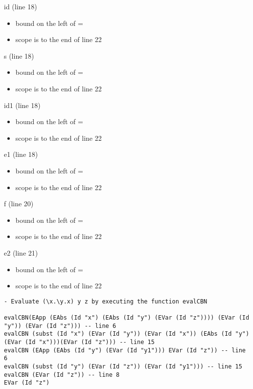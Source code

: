 \documentclass{article}
\theoremstyle{theorem}
\theoremstyle{definition}
\theoremstyle{remark}
\begin{document}
\indent
id (line 18)
\begin{itemize}
  \item bound on the left of =
  \item scope is to the end of line 22
\end{itemize}

\indent
s (line 18)
\begin{itemize}
  \item bound on the left of =
  \item scope is to the end of line 22
\end{itemize}

\indent
id1 (line 18)
\begin{itemize}
  \item bound on the left of =
  \item scope is to the end of line 22
\end{itemize}

\indent
e1 (line 18)
\begin{itemize}
  \item bound on the left of =
  \item scope is to the end of line 22
\end{itemize}

\indent
f (line 20)
\begin{itemize}
  \item bound on the left of =
  \item scope is to the end of line 22
\end{itemize}

\indent
e2 (line 21)
\begin{itemize}
  \item bound on the left of =
  \item scope is to the end of line 22
\end{itemize}

\begin{lstlisting}
- Evaluate (\x.\y.x) y z by executing the function evalCBN

evalCBN(EApp (EAbs (Id "x") (EAbs (Id "y") (EVar (Id "z")))) (EVar (Id "y")) (EVar (Id "z"))) -- line 6
evalCBN (subst (Id "x") (EVar (Id "y")) (EVar (Id "x")) (EAbs (Id "y") (EVar (Id "x")))(EVar (Id "z"))) -- line 15
evalCBN (EApp (EAbs (Id "y") (EVar (Id "y1"))) EVar (Id "z")) -- line 6
evalCBN (subst (Id "y") (EVar (Id "z")) (EVar (Id "y1"))) -- line 15
evalCBN (EVar (Id "z")) -- line 8
EVar (Id "z")
\end{lstlisting}
%
\end{document}
